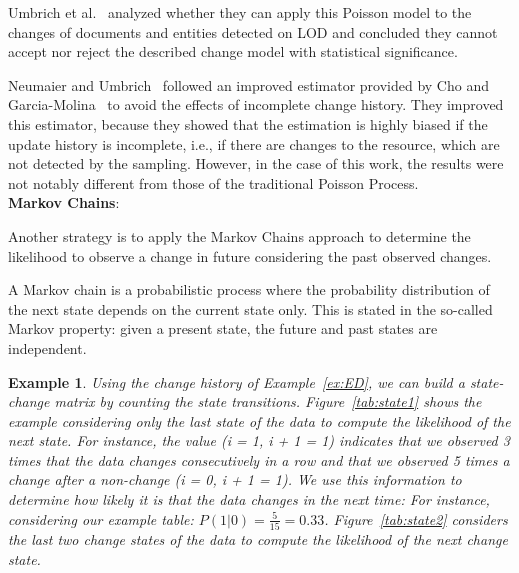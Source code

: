 \documentclass[sw]{iosart2x}
\newtheorem{example}{Example}
\begin{document}
Umbrich et al.~\cite{UmbrichHHPD10} analyzed whether they can apply this Poisson model to the changes of documents and entities detected on LOD and concluded they cannot accept nor reject the described change model with statistical significance.

Neumaier and Umbrich~\cite{NeumaierU16} followed an improved estimator provided by Cho and Garcia-Molina~\cite{ChoG03} to avoid the effects of incomplete change history. They improved this estimator, because they showed that the estimation is highly biased if the update history is incomplete, i.e., if there are changes to the resource, which are not detected by the sampling. However, in the case of this work, the results were not notably different from those of the traditional Poisson Process.\\

\textbf{Markov Chains}:

Another strategy is to apply the Markov Chains approach to determine the likelihood to observe a change in future considering the past observed changes. 

A Markov chain is a probabilistic process where the probability distribution of the next state depends on the current state only. This is stated in the so-called Markov property: given a present state, the future and past states are independent.

\begin{example}
	Using the change history of Example~\ref{ex:ED}, we can build a state-change matrix by counting the state transitions. Figure~\ref{tab:state1} shows the example considering only the last state of the data to compute the likelihood of the next state. For instance, the value (i = 1, i + 1 = 1) indicates that we observed 3 times that the data changes consecutively in a row and that we observed 5 times a change after a non-change (i = 0, i + 1 = 1). We use this information to determine how likely it is that the data changes in the next time: For instance, considering our example table: $P(1|0) = \frac{5}{15} = 0.33$. Figure~\ref{tab:state2} considers the last two change states of the data to compute the likelihood of the next change state.
\end{example}    
\end{document}
